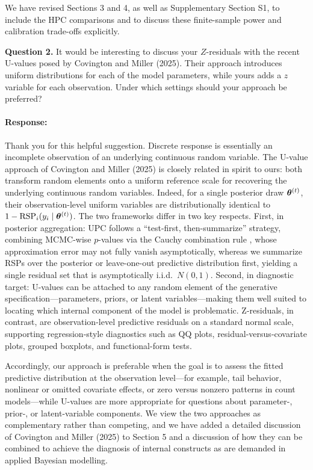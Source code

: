 \documentclass[11pt]{article}
\newcommand*{\mybox}[2]{%
  \par\medskip\noindent
  \colorbox{#1!30}{\parbox{.98\linewidth}{#2}}%
  \par\medskip
}
\begin{document}
We have revised Sections 3 and 4, as well as Supplementary Section S1, to include the HPC comparisons and to discuss these finite-sample power and calibration trade-offs explicitly.


\medskip

\mybox{gray}{\textbf{Question 2.} It would be interesting to discuss your $Z$-residuals with the recent U-values posed by Covington and Miller (2025). Their approach introduces uniform distributions for each of the model parameters, while yours adds a $z$ variable for each observation. Under which settings should your approach be preferred?}

\paragraph{Response:}
Thank you for this helpful suggestion. Discrete response is essentially an incomplete observation of an underlying continuous random variable. The U-value approach of Covington and Miller (2025) is closely related in spirit to ours: both transform random elements onto a uniform reference scale for recovering the underlying continuous random variables. Indeed, for a single posterior draw $\bm{\theta}^{(t)}$, their observation-level uniform variables are distributionally identical to $1 - \text{RSP}_i(y_i \mid \bm{\theta}^{(t)})$. The two frameworks differ in two key respects. First, in posterior aggregation: UPC follows a ``test-first, then-summarize'' strategy, combining MCMC-wise $p$-values via the Cauchy combination rule \citep{liu2020cauchy}, whose approximation error may not fully vanish asymptotically, whereas we summarize RSPs over the posterior or leave-one-out predictive distribution first, yielding a single residual set that is asymptotically i.i.d.\ $N(0,1)$. Second, in diagnostic target: U-values can be attached to any random element of the generative specification---parameters, priors, or latent variables---making them well suited to locating which internal component of the model is problematic. Z-residuals, in contrast, are observation-level predictive residuals on a standard normal scale, supporting regression-style diagnostics such as QQ plots, residual-versus-covariate plots, grouped boxplots, and functional-form tests.

Accordingly, our approach is preferable when the goal is to assess the fitted predictive distribution at the observation level---for example, tail behavior, nonlinear or omitted covariate effects, or zero versus nonzero patterns in count models---while U-values are more appropriate for questions about parameter-, prior-, or latent-variable components. We view the two approaches as complementary rather than competing, and we have added a detailed discussion of Covington and Miller (2025) to Section 5 and a discussion of how they can be combined to achieve the diagnosis of internal constructs as are demanded in applied Bayesian modelling.
\end{document}
